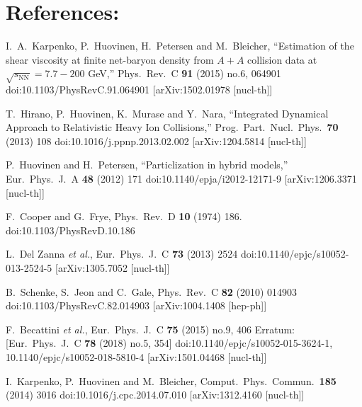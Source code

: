 \documentclass[12pt, a4paper]{report}
\begin{document}
\chapter{References:}
\begin{thebibliography}{20}
	I.~A.~Karpenko, P.~Huovinen, H.~Petersen and M.~Bleicher,
	``Estimation of the shear viscosity at finite net-baryon density from $A+A$ collision data at $\sqrt{s_\mathrm{NN}} = 7.7-200$ GeV,''
	Phys.\ Rev.\ C {\bf 91} (2015) no.6,  064901
	doi:10.1103/PhysRevC.91.064901
	[arXiv:1502.01978 [nucl-th]]
	
	T.~Hirano, P.~Huovinen, K.~Murase and Y.~Nara,
	``Integrated Dynamical Approach to Relativistic Heavy Ion Collisions,''
	Prog.\ Part.\ Nucl.\ Phys.\  {\bf 70} (2013) 108
	doi:10.1016/j.ppnp.2013.02.002
	[arXiv:1204.5814 [nucl-th]]
	
	P.~Huovinen and H.~Petersen,
	``Particlization in hybrid models,''
	Eur.\ Phys.\ J.\ A {\bf 48} (2012) 171
	doi:10.1140/epja/i2012-12171-9
	[arXiv:1206.3371 [nucl-th]]
	
	F.~Cooper and G.~Frye,
	Phys.\ Rev.\ D {\bf 10} (1974) 186.
	doi:10.1103/PhysRevD.10.186
	
	L.~Del Zanna {\it et al.},
	Eur.\ Phys.\ J.\ C {\bf 73} (2013) 2524
	doi:10.1140/epjc/s10052-013-2524-5
	[arXiv:1305.7052 [nucl-th]]
	
	B.~Schenke, S.~Jeon and C.~Gale,
	Phys.\ Rev.\ C {\bf 82} (2010) 014903
	doi:10.1103/PhysRevC.82.014903
	[arXiv:1004.1408 [hep-ph]]
	
	F.~Becattini {\it et al.},
	Eur.\ Phys.\ J.\ C {\bf 75} (2015) no.9,  406
	Erratum: [Eur.\ Phys.\ J.\ C {\bf 78} (2018) no.5,  354]
	doi:10.1140/epjc/s10052-015-3624-1, 10.1140/epjc/s10052-018-5810-4
	[arXiv:1501.04468 [nucl-th]]
	
	I.~Karpenko, P.~Huovinen and M.~Bleicher,
	Comput.\ Phys.\ Commun.\  {\bf 185} (2014) 3016
	doi:10.1016/j.cpc.2014.07.010
	[arXiv:1312.4160 [nucl-th]]
	
\end{thebibliography}
	
\end{document}
